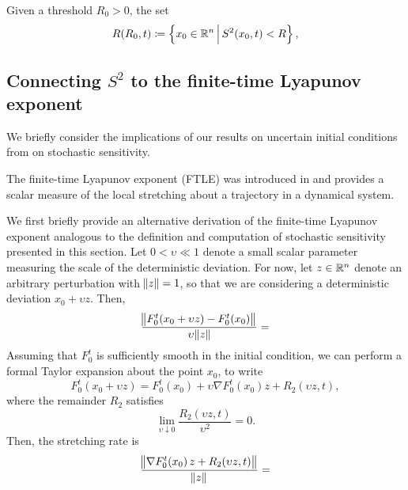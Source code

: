 \begin{definition}\label{def:ss_robust}
	Given a threshold \(R_0 > 0\), the set
	\[
		R\!\left(R_0, t\right) \coloneqq \left\{x_0 \in \mathbb{R}^n\,\middle|\,S^2\!\left(x_0, t\right) < R\right\},
	\]
\end{definition}



\subsection{Connecting \(S^2\) to the finite-time Lyapunov exponent}\label{sec:ftle_s2_connection}
We briefly consider the implications of our results on uncertain initial conditions from  on stochastic sensitivity.

The finite-time Lyapunov exponent (FTLE) was introduced in  and provides a scalar measure of the local stretching about a trajectory in a dynamical system.

We first briefly provide an alternative derivation of the finite-time Lyapunov exponent analogous to the definition and computation of stochastic sensitivity presented in this section.
Let \(0 < \upsilon \ll 1\) denote a small scalar parameter measuring the scale of the deterministic deviation.
For now, let \(z \in \mathbb{R}^n\) denote an arbitrary perturbation with \(\norm{z} = 1\), so that we are considering a deterministic deviation \(x_0 + \upsilon z\).
Then,
\[
	\frac{\norm{F_0^t\!\left(x_0 + \upsilon z\right) - F_0^t\!\left(x_0\right)}}{\upsilon\norm{z}} =
\]
Assuming that \(F_0^t\) is sufficiently smooth in the initial condition, we can perform a formal Taylor expansion \citep{HubbardHubbard_2009_VectorCalculusLinear} about the point \(x_0\), to write
\[
	F_0^t\!\left(x_0 + \upsilon z\right) = F_0^t\!\left(x_0\right) + \upsilon \nabla F_0^t\!\left(x_0\right) z + R_2\!\left(\upsilon z, t\right),
\]
where the remainder \(R_2\) satisfies
\[
	\lim_{\upsilon \downarrow 0}{\frac{R_2\!\left(\upsilon z, t\right)}{\upsilon^2}} = 0.
\]
Then, the stretching rate is
\[
	\frac{\norm{\nabla F_0^t\!\left(x_0\right)z + R_2\!\left(\upsilon z, t\right)}}{\norm{z}} =
\]


